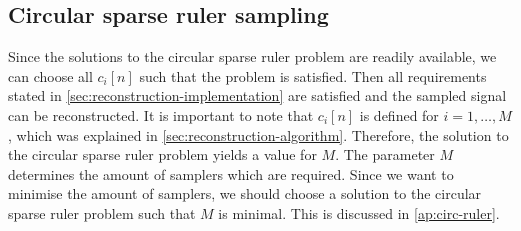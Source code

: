 \documentclass[a4paper, openany, oneside]{memoir}
\begin{document}
\subsection{Circular sparse ruler sampling}\label{sub:ci-circ}
Since the solutions to the circular sparse ruler problem are readily available, we can choose all $c_i[n]$ such that the problem is satisfied. Then all requirements stated in \cref{sec:reconstruction-implementation} are satisfied and the sampled signal can be reconstructed. It is important to note that $c_i[n]$ is defined for $i = 1,\ldots,M$, which was explained in \cref{sec:reconstruction-algorithm}. Therefore, the solution to the circular sparse ruler problem yields a value for $M$. The parameter $M$ determines the amount of samplers which are required. Since we want to minimise the amount of samplers, we should choose a solution to the circular sparse ruler problem such that $M$ is minimal. This is discussed in \cref{ap:circ-ruler}.
\end{document}
